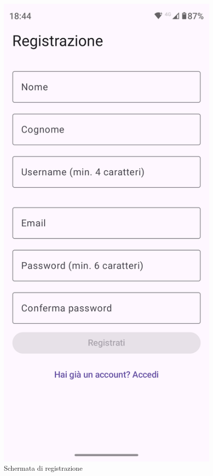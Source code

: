 \documentclass{article}
\begin{document}
\begin{figure}[H]
  \centering
  \includegraphics[width=0.6\linewidth]{register.png}
  \caption{Schermata di registrazione}
  \label{fig:sitemap}
\end{figure}
\end{document}
